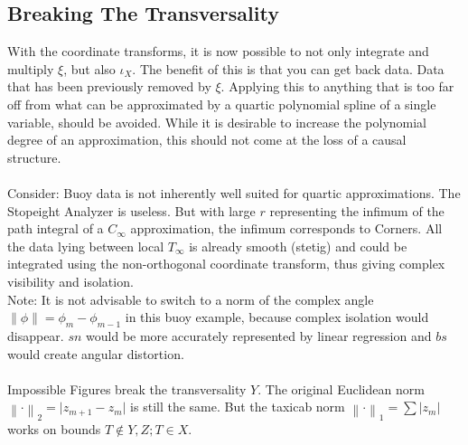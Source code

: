 \documentclass{report}
\newcommand\norm[1]{\left\lVert#1\right\rVert}
\begin{document}
\subsection{Breaking The Transversality}

With the coordinate transforms, it is now possible to not only integrate and multiply $\xi$, but also $\iota_{X}$. The benefit of this is that you can get back data. Data that has been previously removed by $\xi$. Applying this to anything that is too far off from what can be approximated by a quartic polynomial spline of a single variable, should be avoided. While it is desirable to increase the polynomial degree of an approximation, this should not come at the loss of a causal structure.\\\\
Consider: Buoy data is not inherently well suited for quartic approximations. The Stopeight Analyzer is useless. But with large $r$ representing the infimum of the path integral of a $C_{\infty}$ approximation, the infimum corresponds to Corners. All the data lying between local $T_{\infty}$ is already smooth (stetig) and could be integrated using the non-orthogonal coordinate transform, thus giving complex visibility and isolation.\\
Note: It is not advisable to switch to a norm of the complex angle $\norm{\phi} = \phi_{m}-\phi_{m-1}$ in this buoy example, because complex isolation would disappear. $sn$ would be more accurately represented by linear regression and $bs$ would create angular distortion.\\\\
Impossible Figures break the transversality $Y$. The original Euclidean norm $\norm{\cdot}_2 = \lvert z_{m+1}-z_{m} \rvert$ is still the same. But the taxicab norm $\norm{\cdot}_1 = \sum \lvert z_{m} \rvert$ works on bounds $T \not \in Y,Z; T \in X$.
\end{document}
